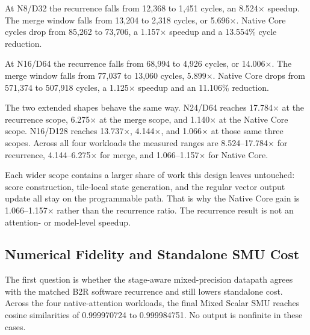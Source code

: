 \documentclass[journal]{IEEEtran}
\begin{document}
At N8/D32 the recurrence falls from 12,368 to 1,451 cycles, an 8.524$\times$
speedup. The merge window falls from 13,204 to 2,318 cycles, or 5.696$\times$.
Native Core cycles drop from 85,262 to 73,706, a 1.157$\times$ speedup and a
13.554\% cycle reduction.

At N16/D64 the recurrence falls from 68,994 to 4,926 cycles, or 14.006$\times$.
The merge window falls from 77,037 to 13,060 cycles, 5.899$\times$. Native Core
drops from 571,374 to 507,918 cycles, a 1.125$\times$ speedup and an 11.106\%
reduction.

The two extended shapes behave the same way. N24/D64 reaches 17.784$\times$ at
the recurrence scope, 6.275$\times$ at the merge scope, and 1.140$\times$ at
the Native Core scope. N16/D128 reaches 13.737$\times$, 4.144$\times$, and
1.066$\times$ at those same three scopes. Across all four workloads the
measured ranges are 8.524--17.784$\times$ for recurrence,
4.144--6.275$\times$ for merge, and 1.066--1.157$\times$ for Native Core.

Each wider scope contains a larger share of work this design leaves untouched:
score construction, tile-local state generation, and the regular vector output
update all stay on the programmable path. That is why the Native Core gain is
1.066--1.157$\times$ rather than the recurrence ratio. The recurrence result is
not an attention- or model-level speedup.

\subsection{Numerical Fidelity and Standalone SMU Cost}
The first question is whether the stage-aware mixed-precision datapath agrees
with the matched B2R software recurrence and still lowers standalone cost. Across the four
native-attention workloads, the final Mixed Scalar SMU reaches cosine
similarities of 0.999970724 to 0.999984751. No output is nonfinite in these
cases.
\end{document}
